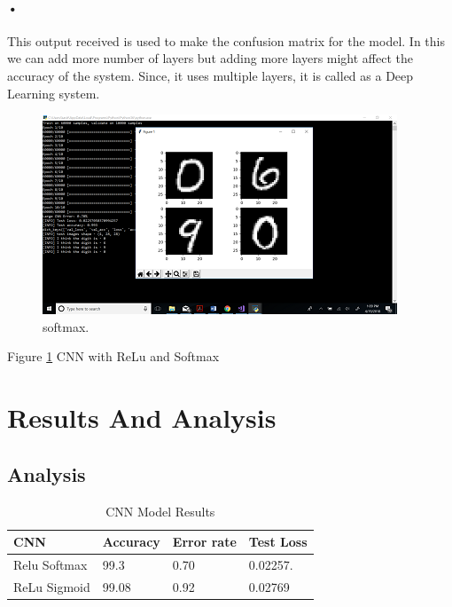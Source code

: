 \documentclass{article}
\begin{document}
\paragraph{•}
This output received is used to make the confusion matrix for the model. In this we can add more number of layers but adding more layers might affect the accuracy of the system. Since, it uses multiple layers,  it is called as a Deep Learning system.
\begin{figure}
  \includegraphics[width=\linewidth]{softmax.png}
  \caption{softmax.}
  \label{fig:softmax}
\end{figure}
Figure \ref{fig:softmax} CNN with ReLu and Softmax

\section{Results And Analysis }
\label{gen_inst}

\subsection{Analysis}

\begin{table}[ht]
\begin{center}
\caption{CNN Model Results} %
\centering 
 	 \label{CNN-table}
 	 \centering
    \begin{tabular}{ | l | l | l | p{5cm} |}
    \hline
    CNN & Accuracy & Error rate & Test Loss \\ \hline
    Relu Softmax & 99.3 & 0.70 & 0.02257. \\ \hline
    ReLu Sigmoid & 99.08 & 0.92 & 0.02769 \\ \hline    
    \end{tabular}
\end{center}

\end{table}
\end{document}
